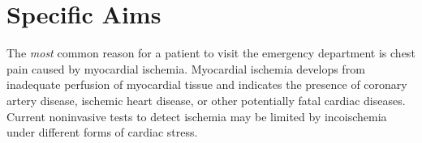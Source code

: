 %


%

\section{Specific Aims}

The \textit{most} common reason for a patient to visit the emergency
department is chest pain caused by myocardial ischemia. Myocardial ischemia
develops from inadequate perfusion of myocardial tissue and indicates the
presence of coronary artery disease, ischemic heart disease, or other
potentially fatal cardiac diseases. Current noninvasive tests to detect
ischemia may be limited by incoischemia under different forms of cardiac stress.
	
